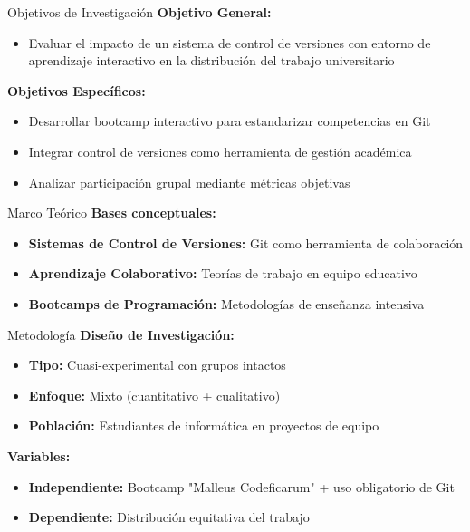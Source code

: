 \documentclass[t]{beamer}
\begin{document}
\begin{frame}{Objetivos de Investigación}
    \textbf{Objetivo General:}
    \begin{itemize}
        \item Evaluar el impacto de un sistema de control de versiones con entorno de aprendizaje interactivo en la distribución del trabajo universitario
    \end{itemize}
    
    \vspace{0.4cm}
    
    \textbf{Objetivos Específicos:}
    \begin{itemize}
        \item Desarrollar bootcamp interactivo para estandarizar competencias en Git
        \item Integrar control de versiones como herramienta de gestión académica
        \item Analizar participación grupal mediante métricas objetivas
    \end{itemize}
\end{frame}

\begin{frame}{Marco Teórico}
    \textbf{Bases conceptuales:}
    \begin{itemize}
        \item \textbf{Sistemas de Control de Versiones:} Git como herramienta de colaboración
        \item \textbf{Aprendizaje Colaborativo:} Teorías de trabajo en equipo educativo
        \item \textbf{Bootcamps de Programación:} Metodologías de enseñanza intensiva
    \end{itemize}
\end{frame}

\begin{frame}{Metodología}
    \textbf{Diseño de Investigación:}
    \begin{itemize}
        \item \textbf{Tipo:} Cuasi-experimental con grupos intactos
        \item \textbf{Enfoque:} Mixto (cuantitativo + cualitativo)
        \item \textbf{Población:} Estudiantes de informática en proyectos de equipo
    \end{itemize}
    
    \vspace{0.3cm}
    
    \textbf{Variables:}
    \begin{itemize}
        \item \textbf{Independiente:} Bootcamp "Malleus Codeficarum" + uso obligatorio de Git
        \item \textbf{Dependiente:} Distribución equitativa del trabajo
    \end{itemize}
\end{frame}
\end{document}
